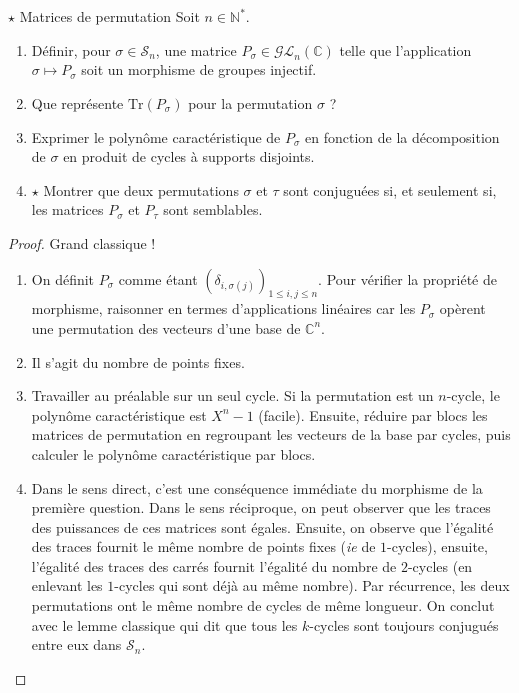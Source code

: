 \documentclass[french,a4paper]{article}
\newcommand{\N}{\mathbb{N}}
\newcommand{\C}{\mathbb{C}}
\newcommand{\st}{^*}
\newcommand{\Tr}{\text{Tr}}
\theoremstyle{plain}
\theoremstyle{definition}
\theoremstyle{remark}
\begin{document}
\begin{ex}[Révisions]{$\star$ Matrices de permutation}
	Soit $n\in\N\st$.
	\begin{enumerate}
		\item Définir, pour $\sigma\in\mathcal{S}_n$, une matrice $P_\sigma\in\mathcal{GL}_n(\C)$ telle que l'application $\sigma\mapsto P_\sigma$ soit un morphisme de groupes injectif.
		\item Que représente $\Tr(P_\sigma)$ pour la permutation $\sigma$ ?
		\item Exprimer le polynôme caractéristique de $P_\sigma$ en fonction de la décomposition de $\sigma$ en produit de cycles à supports disjoints.
		\item $\star$ Montrer que deux permutations $\sigma$ et $\tau$ sont conjuguées si, et seulement si, les matrices $P_\sigma$ et $P_\tau$ sont semblables.
	\end{enumerate}
\end{ex}
\begin{proof}
	Grand classique !
	\begin{enumerate}
		\item On définit $P_\sigma$ comme étant $(\delta_{i,\sigma(j)})_{1\leqslant i,j\leqslant n}$. Pour vérifier la propriété de morphisme, raisonner en termes d'applications linéaires car les $P_\sigma$ opèrent une permutation des vecteurs d'une base de $\C^n$.
		\item Il s'agit du nombre de points fixes.
		\item Travailler au préalable sur un seul cycle. Si la permutation est un $n$-cycle, le polynôme caractéristique est $X^n-1$ (facile). Ensuite, réduire par blocs les matrices de permutation en regroupant les vecteurs de la base par cycles, puis calculer le polynôme caractéristique par blocs.
		\item Dans le sens direct, c'est une conséquence immédiate du morphisme de la première question. Dans le sens réciproque, on peut observer que les traces des puissances de ces matrices sont égales. Ensuite, on observe que l'égalité des traces fournit le même nombre de points fixes (\textit{ie} de $1$-cycles), ensuite, l'égalité des traces des carrés fournit l'égalité du nombre de $2$-cycles (en enlevant les $1$-cycles qui sont déjà au même nombre). Par récurrence, les deux permutations ont le même nombre de cycles de même longueur. On conclut avec le lemme classique qui dit que tous les $k$-cycles sont toujours conjugués entre eux dans $\mathcal{S}_n$.
	\end{enumerate}
\end{proof}
\end{document}
